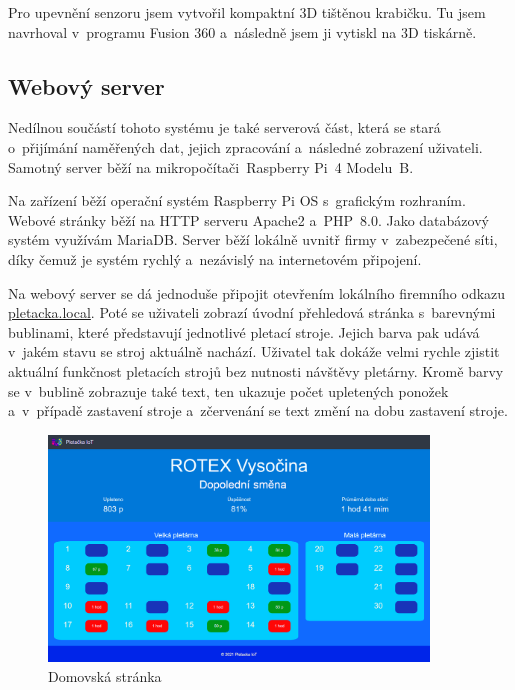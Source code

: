 \documentclass[12pt, a4paper]{article}
\begin{document}
Pro upevnění senzoru jsem vytvořil kompaktní 3D tištěnou krabičku. 
Tu jsem navrhoval v~programu Fusion 360 a~následně jsem ji vytiskl na 3D tiskárně.


\subsection*{Webový server}

Nedílnou součástí tohoto systému je také serverová část, která se stará o~přijímání na\-mě\-ře\-ných dat, jejich zpracování a~následné zobrazení uživateli.
Samotný server běží na mikropočítači~Raspberry Pi~4 Modelu~B.

Na zařízení běží operační systém Raspberry Pi OS s~grafickým rozhraním.
Webové stránky běží na HTTP serveru Apache2 a~PHP~8.0.
Jako databázový systém využívám MariaDB.
Server běží lokálně uvnitř firmy v~zabezpečené síti, díky čemuž je systém rychlý a~nezávislý na internetovém připojení.

Na webový server se dá jednoduše připojit otevřením lokálního firemního odkazu \newline\href{http://pletacka.local}{pletacka.local}.
Poté se uživateli zobrazí úvodní přehledová stránka s~barevnými bublinami, které představují jednotlivé pletací stroje.
Jejich barva pak udává v~jakém stavu se stroj aktuálně nachází. Uživatel tak dokáže velmi rychle zjistit aktuální funkčnost pletacích strojů bez nutnosti návštěvy pletárny.
Kromě barvy se v~bublině zobrazuje také text, ten ukazuje počet upletených ponožek a~v~případě zastavení stroje a~zčervenání se text změní na dobu zastavení stroje.

\begin{figure}[t]
    \centering
    \includegraphics[width=0.9\textwidth]{img/Uvod.png}
    \caption{Domovská stránka}
    \label{fig:webUvod}
\end{figure}
\end{document}
